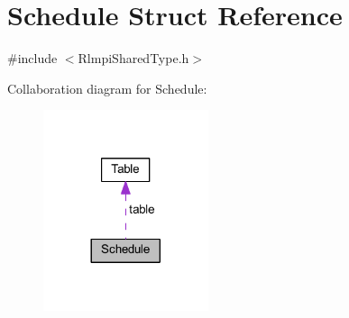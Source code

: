 \hypertarget{structSchedule}{}\section{Schedule Struct Reference}
\label{structSchedule}


{\ttfamily \#include $<$Rlmpi\+Shared\+Type.\+h$>$}



Collaboration diagram for Schedule\+:
\nopagebreak
\begin{figure}[H]
\begin{center}
\leavevmode
\includegraphics[width=137pt]{structSchedule__coll__graph}
\end{center}
\end{figure}
